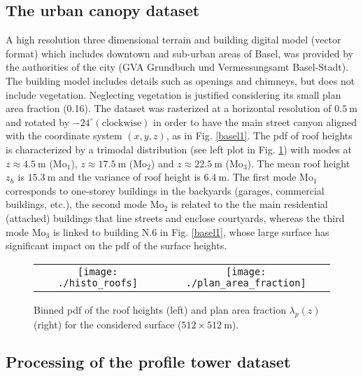\subsection{The urban canopy dataset}
A high resolution three dimensional terrain and building digital model (vector format) which includes downtown and sub-urban areas of Basel, was provided by the authorities of the city (GVA Grundbuch und Vermessungsamt Basel-Stadt). 
The building model includes details such as openings and chimneys, but does not include vegetation. Neglecting vegetation is justified considering its small plan area fraction (0.16).
The dataset was rasterized at a horizontal resolution of $0.5 \ \mathrm{m}$ and rotated by $-24^{\circ} (\text{clockwise})$ in order to have the main street canyon aligned with the coordinate system $(x,y,z)$, as in Fig. \ref{basel1}. 
The pdf of roof heights is characterized by a trimodal distribution (see left plot in Fig. \ref{roofs_stats}) with modes at $z \approx 4.5 \ \mathrm{m}$ (Mo$_1$), $z \approx 17.5 \ \mathrm{m}$ (Mo$_2$) and $z \approx 22.5 \ \mathrm{m}$ (Mo$_3$).
The mean roof height $z_h$ is $15.3 \ \mathrm{m}$ and the variance of roof height is $6.4 \ \mathrm{m}$. 
The first mode Mo$_1$ corresponds to one-storey buildings in the backyards (garages, commercial buildings, etc.), the second mode Mo$_2$ is related to the the main residential (attached) buildings that line streets and enclose courtyards, whereas the third mode Mo$_3$ is linked to building N.6 in Fig. \ref{basel1}, whose large surface has significant impact on the pdf of the surface heights.
%
\begin{figure}
	\centering
        \begin{tabular}{c c}
        \texttt{[image: ./histo\_roofs]} &
        \texttt{[image: ./plan\_area\_fraction]} 
       \end{tabular}
       \caption{Binned pdf of the roof heights (left) and plan area fraction $\lambda_p(z)$ (right) for the considered surface ($512 \times 512 \ \mathrm{m}$). }
      \label{roofs_stats}
\end{figure}
%


\subsection{Processing of the profile tower dataset}

